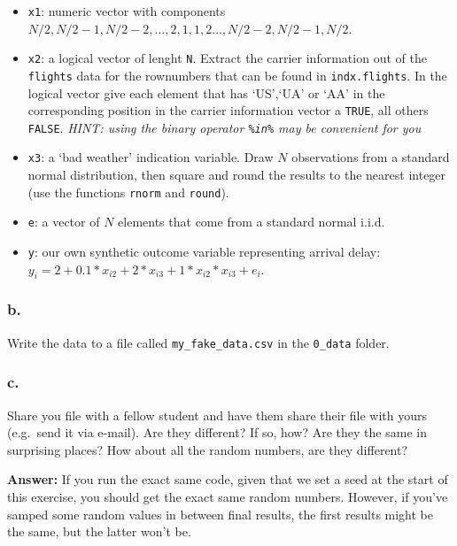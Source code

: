 \documentclass[]{article}
\providecommand{\tightlist}{%
  \setlength{\itemsep}{0pt}\setlength{\parskip}{0pt}}
\begin{document}
\begin{itemize}
\tightlist
\item
  \texttt{x1}: numeric vector with components
  \(N/2,N/2 -1, N/2 - 2,\ldots,2,1,1,2 \ldots, N/2 - 2, N/2 - 1,N /2\).
\item
  \texttt{x2}: a logical vector of lenght \texttt{N}. Extract the
  carrier information out of the \texttt{flights} data for the
  rownumbers that can be found in \texttt{indx.flights}. In the logical
  vector give each element that has `US',`UA' or `AA' in the
  corresponding position in the carrier information vector a
  \texttt{TRUE}, all others \texttt{FALSE}. \emph{HINT: using the binary
  operator \texttt{\%in\%} may be convenient for you}
\item
  \texttt{x3}: a `bad weather' indication variable. Draw \(N\)
  observations from a standard normal distribution, then square and
  round the results to the nearest integer (use the functions
  \texttt{rnorm} and \texttt{round}).
\item
  \texttt{e}: a vector of \(N\) elements that come from a standard
  normal i.i.d.
\item
  \texttt{y}: our own synthetic outcome variable representing arrival
  delay: \(y_i = 2 + 0.1*x_{i2} + 2*x_{i3} + 1*x_{i2}*x_{i3} + e_i\).
\end{itemize}

\hypertarget{b.-1}{%
\subsubsection{b.}\label{b.-1}}

Write the data to a file called \texttt{my\_fake\_data.csv} in the
\texttt{0\_data} folder.

\hypertarget{c.-1}{%
\subsubsection{c.}\label{c.-1}}

Share you file with a fellow student and have them share their file with
yours (e.g.~send it via e-mail). Are they different? If so, how? Are
they the same in surprising places? How about all the random numbers,
are they different?

\textbf{Answer:} If you run the exact same code, given that we set a
seed at the start of this exercise, you should get the exact same random
numbers. However, if you've samped some random values in between final
results, the first results might be the same, but the latter won't be.
\end{document}
